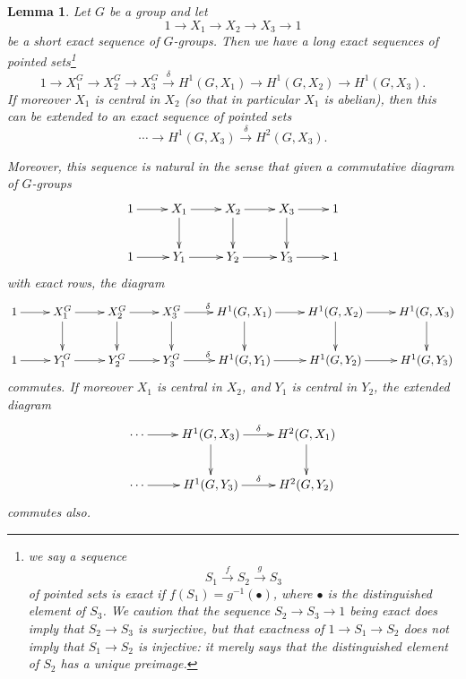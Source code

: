 \documentclass[11pt]{amsart}
\numberwithin{equation}{section}
\newtheorem{lemma}[equation]{Lemma}
\theoremstyle{remark}
\theoremstyle{remark}
\theoremstyle{remark}
\theoremstyle{definition}
\theoremstyle{definition}
\theoremstyle{definition}
\theoremstyle{definition}
\theoremstyle{definition}
\theoremstyle{definition}
\begin{document}
\begin{lemma} \label{non anelian exact sequence}
Let $G$ be a group and let
\[1\rightarrow X_1\rightarrow X_2\rightarrow X_3\rightarrow 1\]
be a short exact sequence of $G$-groups.  Then we have a long exact sequences of pointed sets\footnote{we say a sequence \[S_1\stackrel{f}{\longrightarrow} S_2 \stackrel{g}{\longrightarrow} S_3\] of pointed sets is \textit{exact} if $f(S_1)=g^{-1}(\bullet)$, where $\bullet$ is the distinguished element of $S_3$. We caution that the sequence $S_2\rightarrow S_3\rightarrow 1$ being exact \textit{does} imply that $S_2\rightarrow S_3$ is surjective, but that exactness of $1\rightarrow S_1\rightarrow S_2$ \textit{does not} imply that $S_1\rightarrow S_2$ is injective: it merely says that the distinguished element of $S_2$ has a unique preimage.}
\[1\rightarrow X_1^G\rightarrow X_2^G\rightarrow X_3^G\stackrel{\delta}{\longrightarrow}H^1(G,X_1)\rightarrow H^1(G,X_2)\rightarrow H^1(G,X_3).\]
If moreover $X_1$ is central in $X_2$ (so that in particular $X_1$ is abelian), then this can be extended to an exact sequence of pointed sets
\[\cdots \rightarrow H^1(G,X_3)\stackrel{\delta}{\longrightarrow}H^2(G,X_3).\] 

Moreover, this sequence is natural in the sense that given a commutative diagram of $G$-groups
\[
\xymatrix{1\ar[r]&X_1\ar[r]\ar[d]&X_2\ar[r]\ar[d]& X_3\ar[r]\ar[d]&1\\1\ar[r]&Y_1\ar[r]&
Y_2\ar[r] &Y_3\ar[r]&1
}
\] 
with exact rows, the diagram
\[
\xymatrix{1\ar[r]&X_1^G\ar[r]\ar[d]&X_2^G\ar[r]\ar[d]& X_3^G\ar[r]^\delta\ar[d]&H^1(G,X_1)\ar[r]\ar[d]&H^1(G,X_2)\ar[r]\ar[d]&H^1(G,X_3)\ar[d]\\1\ar[r]&Y_1^G\ar[r]&
Y_2^G\ar[r] &Y_3^G\ar[r]^\delta&H^1(G,Y_1)\ar[r]&H^1(G,Y_2)\ar[r]&H^1(G,Y_3)
}
\] 
commutes. If moreover $X_1$ is central in $X_2$, and $Y_1$ is central in $Y_2$, the extended diagram
\[\xymatrix{\cdots\ar[r]&H^1(G,X_3)\ar[r]^\delta\ar[d]&H^2(G,X_1)\ar[d]\\
\cdots\ar[r]&H^1(G,Y_3)\ar[r]^\delta&H^2(G,Y_2)}\]
commutes also. 
\end{lemma}
\end{document}
